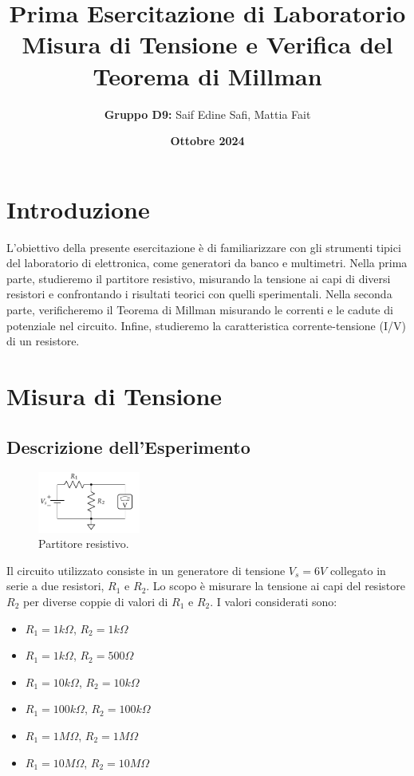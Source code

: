 \documentclass[a4paper,6pt]{article}
\title{\Large\textbf{Prima Esercitazione di Laboratorio}\\ \vspace{0.5em} \large Misura di Tensione e Verifica del Teorema di Millman}
\author{\textbf{Gruppo D9:} Saif Edine Safi, Mattia Fait}
\date{\textbf{Ottobre 2024}}
\begin{document}
\maketitle
\tableofcontents %
\newpage

\section{Introduzione}
L'obiettivo della presente esercitazione è di familiarizzare con gli strumenti tipici del laboratorio di elettronica, come generatori da banco e multimetri. Nella prima parte, studieremo il partitore resistivo, misurando la tensione ai capi di diversi resistori e confrontando i risultati teorici con quelli sperimentali. Nella seconda parte, verificheremo il Teorema di Millman misurando le correnti e le cadute di potenziale nel circuito. Infine, studieremo la caratteristica corrente-tensione (I/V) di un resistore.



\section{Misura di Tensione}


\subsection{Descrizione dell'Esperimento}

\begin{figure}[!ht]
    \centering
    \includegraphics[width=0.3\textwidth]{assets/1.png}
    \caption{Partitore resistivo.}
    \label{fig:primo}
\end{figure}

Il circuito utilizzato consiste in un generatore di tensione \(V_s = 6 V\) collegato in serie a due resistori, \(R_1\) e \(R_2\). Lo scopo è misurare la tensione ai capi del resistore \(R_2\) per diverse coppie di valori di \(R_1\) e \(R_2\). I valori considerati sono:

\begin{itemize}
    \item \(R_1 = 1 k\Omega\), \(R_2 = 1 k\Omega\)
    \item \(R_1 = 1 k\Omega\), \(R_2 = 500 \Omega\)
    \item \(R_1 = 10 k\Omega\), \(R_2 = 10 k\Omega\)
    \item \(R_1 = 100 k\Omega\), \(R_2 = 100 k\Omega\)
    \item \(R_1 = 1 M\Omega\), \(R_2 = 1 M\Omega\)
    \item \(R_1 = 10 M\Omega\), \(R_2 = 10 M\Omega\)
\end{itemize}
\end{document}
